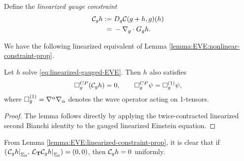 \documentclass{article}
\begin{document}
\begin{definition}
  Define the \emph{linearized gauge constraint} \begin{equation*}
    \begin{split}
      \mathcal{C}_{g}{h}:={}&D_{g}\mathcal{C}(g+{h}, g)({h})\\
      ={}& -\nabla_{g}\cdot G_{g}{h}.
    \end{split}    
  \end{equation*}
\end{definition}
We have the following linearized equivalent of Lemma
\ref{lemma:EVE:nonlinear-constraint-prop}.
\begin{lemma}
  \label{lemma:EVE:linearized-constraint-prop}
  Let ${h}$ solve \eqref{eq:linearized-gauged-EVE}. Then ${h}$
  also satisfies
  \begin{equation*}
    \Box^{CP}_{g}(\mathcal{C}_{g}{h}) = 0, \qquad
    \Box^{CP}_{g}\psi = \Box^{(1)}_g\psi, 
  \end{equation*}
  where $\Box^{(1)}_g = \nabla^\alpha \nabla_\alpha $ denotes
  the wave operator acting on 1-tensors. 
\end{lemma}
\begin{proof}
  The lemma follows directly by applying the twice-contracted
  linearized second Bianchi identity to the gauged linearized Einstein
  equation.
\end{proof}
\begin{remark}
  From Lemma \ref{lemma:EVE:linearized-constraint-prop}, it is clear
  that if $(\evalAt*{\Constraint_{g}{h}}_{\Sigma_0}, \evalAt*{\LieDerivative_{\KillT}\Constraint_{g}{h}}_{\Sigma_0}) = (0, 0)$, then
  $\mathcal{C}_{g}{h} = 0$ uniformly.  
\end{remark}
\end{document}
